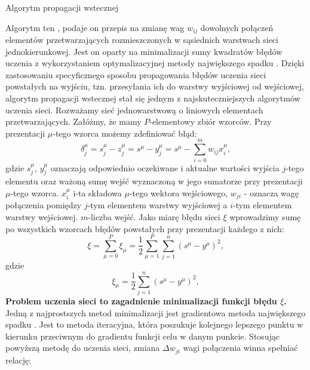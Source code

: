 \begin{easyappendix}{Algorytm propagacji wstecznej}

Algorytm ten \cite{korbicz1994}, podaje on przepis na zmianę wag \(w_{ij}\) dowolnych połączeń elementów przetwarzających rozmieszczonych w sąsiednich warstwach sieci jednokierunkowej. Jest on oparty na minimalizacji sumy kwadratów błędów uczenia z wykorzystaniem optymalizacyjnej metody największego spadku \cite{wit1986}. Dzięki zastosowaniu specyficznego sposobu propagowania błędów uczenia sieci powstałych na wyjściu, tzn. przesyłania ich do warstwy wyjściowej od wejściowej, algorytm propagacji wstecznej stał się jednym z najskuteczniejszych algorytmów uczenia sieci. 
Rozważamy sieć jednowarstwową o liniowych elementach przetwarzających. Załóżmy, że mamy \(P\)-elementowy zbiór wzorców. Przy prezentacji \(\mu\)-tego wzorca możemy zdefiniować błąd: 
\begin{equation}
       \delta^\mu_j =s^\mu_j-z^\mu_j=s^\mu-y^\mu_j=s^\mu-\sum_{i=0}^{m} w_{ij}x^\mu_i,
\end{equation}
gdzie \(s_j^\mu\), \(y^\mu_j\) oznaczają odpowiednio oczekiwane i aktualne wartości wyjścia \(j\)-tego elementu oraz ważoną sumę wejść wyznaczoną w jego sumatorze przy prezentacji \(\mu\)-tego wzorca. \(x^\mu_i\) i-ta składowa \(\mu\)-tego wektora wejściowego, \(w_{ji}\) - oznacza wagę połączenia pomiędzy \(j\)-tym elementem warstwy wyjściowej a \(i\)-tym elementem warstwy wejściowej. \(m\)-liczba wejść.
\newline
Jako miarę błędu sieci \(\xi\) wprowadzimy sumę po wszystkich wzorcach błędów powstałych przy prezentacji każdego z nich:
\begin{equation}
       \xi = \sum_{\mu=0}^{P}\xi_\mu = \frac {1}{2} \sum ^{P}_{\mu=1} \sum ^{n}_{j=1} (s^\mu-y^\mu)^2,
\end{equation}
gdzie
\begin{equation}
       \xi_\mu = \frac {1}{2} \sum ^{n}_{j=1} (s^\mu-y^\mu)^2,
\end{equation}
\textbf{Problem uczenia sieci to zagadnienie minimalizacji funkcji błędu \(\xi\).} Jedną z najprostszych metod minimalizacji jest gradientowa metoda największego spadku \cite{wit1986}. Jest to metoda iteracyjna, która poszukuje kolejnego lepszego punktu w kierunku przeciwnym do gradientu funkcji celu w danym punkcie. Stosując powyższą metodę do uczenia sieci, zmiana \(\Delta w_{ji}\)  wagi połączenia winna spełniać relację:


\end{easyappendix}
